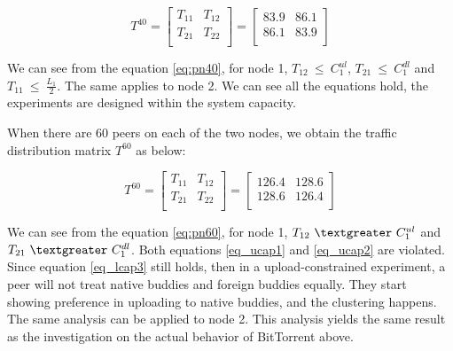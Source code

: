 \documentclass[10pt,letterpaper,twocolumn]{article}
\begin{document}
\begin{equation}
\label{eq:pn40}
T^{40} = 
\begin{bmatrix}
T_{11} & T_{12} \\
T_{21} & T_{22} \\
\end{bmatrix}
=
\begin{bmatrix}
83.9 & 86.1 \\
86.1 & 83.9 \\
\end{bmatrix}
\end{equation}

We can see from the equation \eqref{eq:pn40}, for node 1,
$T_{12}~\leqslant~C_{1}^{ul}$, $T_{21}~\leqslant~C_{1}^{dl}$ and
$T_{11}~\leqslant~\frac{L_{1}}{2}$. The same applies to node 2. We can
see all the equations hold, the experiments are designed within the
system capacity.



When there are 60 peers on each of the two nodes, we obtain the traffic
distribution matrix $T^{60}$ as below:

\begin{equation}
\label{eq:pn60}
T^{60} = 
\begin{bmatrix}
T_{11} & T_{12} \\
T_{21} & T_{22} \\
\end{bmatrix}
=
\begin{bmatrix}
126.4 & 128.6 \\
128.6 & 126.4 \\
\end{bmatrix}
\end{equation}

We can see from the equation \eqref{eq:pn60}, for node 1,
$T_{12}~\textgreater~C_{1}^{ul}$ and
$T_{21}~\textgreater~C_{1}^{dl}$. Both equations \eqref{eq_ucap1} and
\eqref{eq_ucap2} are violated. Since equation \eqref{eq_lcap3} still
holds, then in a upload-constrained experiment, a peer will not treat
native buddies and foreign buddies equally. They start showing
preference in uploading to native buddies, and the clustering
happens. The same analysis can be applied to node 2. This analysis
yields the same result as the investigation on the actual behavior of
BitTorrent above.
\end{document}
